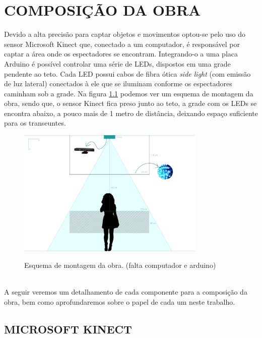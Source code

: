 \chapter{COMPOSIÇÃO DA OBRA}

Devido a alta precisão para captar objetos e movimentos optou-se pelo uso do sensor Microsoft Kinect que, conectado a um computador, é responsável por captar a área onde os espectadores se encontram. Integrando-o a uma placa Arduino é possível controlar uma série de LEDs, dispostos em uma grade pendente ao teto. Cada LED possui cabos de fibra ótica \textit{side light} (com emissão de luz lateral) conectados à ele que se iluminam conforme os espectadores caminham sob a grade. Na figura \ref{fig:esquema} podemos ver um esquema de montagem da obra, sendo que, o sensor Kinect fica preso junto ao teto, a grade com os LEDs se encontra abaixo, a pouco mais de 1 metro de distância, deixando espaço suficiente para os transeuntes.

\begin{figure}[H]
    \centering
    \caption{Esquema de montagem da obra. (falta computador e arduino)}
	\vspace*{0,2cm}
    \includegraphics[width=0.8\textwidth]{./04-figuras/esquema}
    \label{fig:esquema}
\end{figure}
\vspace*{-0,9cm}
{\raggedright {}}\\

A seguir veremos um detalhamento de cada componente para a composição da obra, bem como aprofundaremos sobre o papel de cada um neste trabalho. 

\section{MICROSOFT KINECT}

